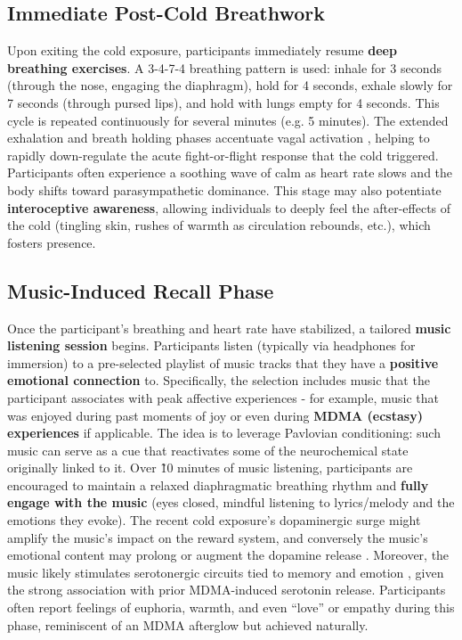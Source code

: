 \documentclass[11pt]{article}
\newcommand{\quotes}[1]{``#1''}
\begin{document}
\subsection{Immediate Post-Cold Breathwork}
Upon exiting the cold exposure, participants immediately resume \textbf{deep breathing exercises}. A 3-4-7-4 breathing pattern is used: inhale for 3 seconds (through the nose, engaging the diaphragm), hold for 4 seconds, exhale slowly for 7 seconds (through pursed lips), and hold with lungs empty for 4 seconds. This cycle is repeated continuously for several minutes (e.g. 5 minutes). The extended exhalation and breath holding phases accentuate vagal activation \cite{Gerritsen2018}, helping to rapidly down-regulate the acute fight-or-flight response that the cold triggered. Participants often experience a soothing wave of calm as heart rate slows and the body shifts toward parasympathetic dominance. This stage may also potentiate \textbf{interoceptive awareness}, allowing individuals to deeply feel the after-effects of the cold (tingling skin, rushes of warmth as circulation rebounds, etc.), which fosters presence.

\subsection{Music-Induced Recall Phase}
Once the participant's breathing and heart rate have stabilized, a tailored \textbf{music listening session} begins. Participants listen (typically via headphones for immersion) to a pre-selected playlist of music tracks that they have a \textbf{positive emotional connection} to. Specifically, the selection includes music that the participant associates with peak affective experiences - for example, music that was enjoyed during past moments of joy or even during \textbf{MDMA (ecstasy) experiences} if applicable. The idea is to leverage Pavlovian conditioning: such music can serve as a cue that reactivates some of the neurochemical state originally linked to it. Over \~10 minutes of music listening, participants are encouraged to maintain a relaxed diaphragmatic breathing rhythm and \textbf{fully engage with the music} (eyes closed, mindful listening to lyrics/melody and the emotions they evoke). The recent cold exposure's dopaminergic surge might amplify the music's impact on the reward system, and conversely the music's emotional content may prolong or augment the dopamine release \cite{Feduccia2008}. Moreover, the music likely stimulates serotonergic circuits tied to memory and emotion \cite{Dean2023}, given the strong association with prior MDMA-induced serotonin release. Participants often report feelings of euphoria, warmth, and even \quotes{love} or empathy during this phase, reminiscent of an MDMA afterglow but achieved naturally.
\end{document}
